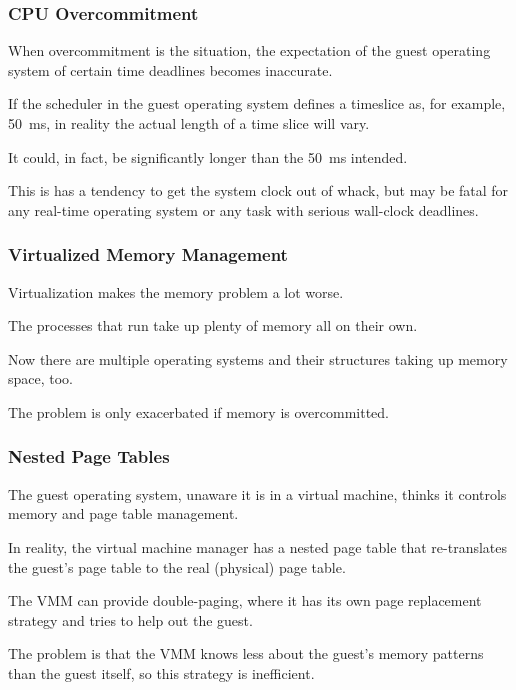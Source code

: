 \begin{frame}
\frametitle{CPU Overcommitment}

When overcommitment is the situation, the expectation of the guest operating system of certain time deadlines becomes inaccurate. 

If the scheduler in the guest operating system defines a timeslice as, for example, 50~ms, in reality the actual length of a time slice will vary. 

It could, in fact, be significantly longer than the 50~ms intended. 

This is has a tendency to get the system clock out of whack, but may be fatal for any real-time operating system or any task with serious wall-clock deadlines.

\end{frame}

\begin{frame}
\frametitle{Virtualized Memory Management}

Virtualization makes the memory problem a lot worse.

The processes that run take up plenty of memory all on their own. 

Now there are multiple operating systems and their structures taking up memory space, too. 

The problem is only exacerbated if memory is overcommitted.

\end{frame}

\begin{frame}
\frametitle{Nested Page Tables}

The guest operating system, unaware it is in a virtual machine, thinks it controls memory and page table management. 

In reality, the virtual machine manager has a nested page table that re-translates the guest's page  table to the real (physical) page table. 

The VMM can provide double-paging, where it has its own page replacement strategy and tries to help out the guest.

The problem is that the VMM knows less about the guest's memory patterns than the guest itself, so this strategy is inefficient.


\end{frame}


